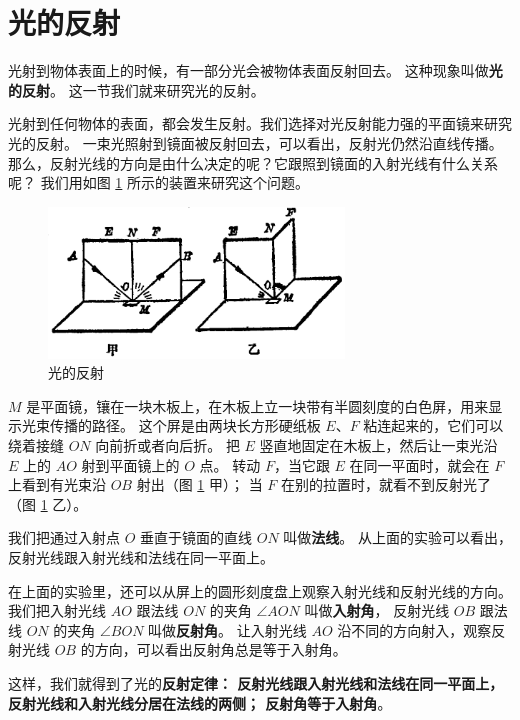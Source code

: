 \section{光的反射}\label{sec:1-2}

光射到物体表面上的时候，有一部分光会被物体表面反射回去。
这种现象叫做\textbf{光的反射}。 这一节我们就来研究光的反射。

光射到任何物体的表面，都会发生反射。我们选择对光反射能力强的平面镜来研究光的反射。
一束光照射到镜面被反射回去，可以看出，反射光仍然沿直线传播。
那么，反射光线的方向是由什么决定的呢？它跟照到镜面的入射光线有什么关系呢？
我们用如图 \ref{fig:1-4} 所示的装置来研究这个问题。

\begin{figure}[htbp]
    \centering
    \includegraphics[width=0.7\textwidth]{../pic/czwl2-ch1-4}
    \caption{光的反射}\label{fig:1-4}
\end{figure}

$M$ 是平面镜，镶在一块木板上，在木板上立一块带有半圆刻度的白色屏，用来显示光束传播的路径。
这个屏是由两块长方形硬纸板 $E$、$F$ 粘连起来的，它们可以绕着接缝 $ON$ 向前折或者向后折。
把 $E$ 竖直地固定在木板上，然后让一束光沿 $E$ 上的 $AO$ 射到平面镜上的 $O$ 点。
转动 $F$，当它跟 $E$ 在同一平面时，就会在 $F$ 上看到有光束沿 $OB$ 射出（图 \ref{fig:1-4} 甲）；
当 $F$ 在别的拉置时，就看不到反射光了（图 \ref{fig:1-4} 乙）。

我们把通过入射点 $O$ 垂直于镜面的直线 $ON$ 叫做\textbf{法线}。
从上面的实验可以看出，反射光线跟入射光线和法线在同一平面上。

在上面的实验里，还可以从屏上的圆形刻度盘上观察入射光线和反射光线的方向。
我们把入射光线 $AO$ 跟法线 $ON$ 的夹角 $\angle AON$ 叫做\textbf{入射角}，
     反射光线 $OB$ 跟法线 $ON$ 的夹角 $\angle BON$ 叫做\textbf{反射角}。
让入射光线 $AO$ 沿不同的方向射入，观察反射光线 $OB$ 的方向，可以看出反射角总是等于入射角。

这样，我们就得到了光的\textbf{反射定律：
反射光线跟入射光线和法线在同一平面上，
反射光线和入射光线分居在法线的两侧；
反射角等于入射角}。


